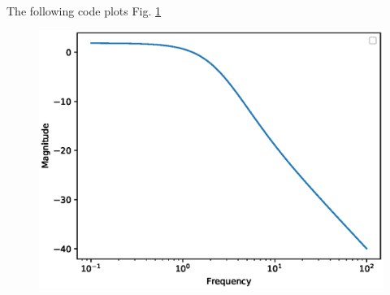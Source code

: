 \begin{enumerate}[label=\thesubsection.\arabic*.,ref=\thesubsection.\theenumi]
\\
\solution The following code plots Fig. \ref{fig:ee18btech11011}
%
\begin{figure}[!ht]
	\begin{center}
\includegraphics[width=\columnwidth]{./figs/ee18btech11011.eps}		
	\end{center}
\caption{}
\label{fig:ee18btech11011}
\end{figure}

\end{enumerate}

